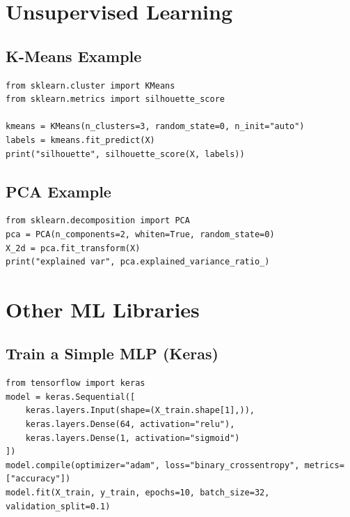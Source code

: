 \section{Unsupervised Learning}

\subsection*{K-Means Example}
\begin{lstlisting}
from sklearn.cluster import KMeans
from sklearn.metrics import silhouette_score

kmeans = KMeans(n_clusters=3, random_state=0, n_init="auto")
labels = kmeans.fit_predict(X)
print("silhouette", silhouette_score(X, labels))
\end{lstlisting}

\subsection*{PCA Example}
\begin{lstlisting}
from sklearn.decomposition import PCA
pca = PCA(n_components=2, whiten=True, random_state=0)
X_2d = pca.fit_transform(X)
print("explained var", pca.explained_variance_ratio_)
\end{lstlisting}

\section{Other ML Libraries}

\subsection*{Train a Simple MLP (Keras)}
\begin{lstlisting}
from tensorflow import keras
model = keras.Sequential([
    keras.layers.Input(shape=(X_train.shape[1],)),
    keras.layers.Dense(64, activation="relu"),
    keras.layers.Dense(1, activation="sigmoid")
])
model.compile(optimizer="adam", loss="binary_crossentropy", metrics=["accuracy"])
model.fit(X_train, y_train, epochs=10, batch_size=32, validation_split=0.1)
\end{lstlisting}

